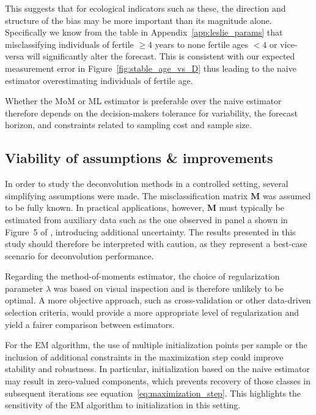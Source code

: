 \documentclass[11pt,a4paper]{article}
\begin{document}
This suggests that for ecological indicators such as these, the direction and structure of the bias may be more important than its magnitude alone. Specifically we know from the table in Appendix~\ref{app:leslie_params} that misclassifying individuals of fertile $\geq 4$ years to none fertile ages $< 4$ or vice-versa will significantly alter the forecast. This is consistent with our expected measurement error in Figure~\ref{fig:stable_age_vs_D} thus leading to the naive estimator overestimating individuals of fertile age. 

Whether the MoM or ML estimator is preferable over the naive estimator therefore depends on the decision-makers tolerance for variability, the forecast horizon, and constraints related to sampling cost and sample size.

\subsection{Viability of assumptions \& improvements}

In order to study the deconvolution methods in a controlled setting, several simplifying assumptions were made. The misclassification matrix $\boldsymbol{M}$ was assumed to be fully known. In practical applications, however, $\boldsymbol{M}$ must typically be estimated from auxiliary data such as the one observed in panel a shown in Figure~5 of \cite{nakamura2023}, introducing additional uncertainty. The results presented in this study should therefore be interpreted with caution, as they represent a best-case scenario for deconvolution performance.

Regarding the method-of-moments estimator, the choice of regularization parameter $\lambda$ was based on visual inspection and is therefore unlikely to be optimal. A more objective approach, such as cross-validation or other data-driven selection criteria, would provide a more appropriate level of regularization and yield a fairer comparison between estimators.

For the EM algorithm, the use of multiple initialization points per sample or the inclusion of additional constraints in the maximization step could improve stability and robustness. In particular, initialization based on the naive estimator may result in zero-valued components, which prevents recovery of those classes in subsequent iterations see equation~\eqref{eq:maximization_step}. This highlights the sensitivity of the EM algorithm to initialization in this setting.
\end{document}
